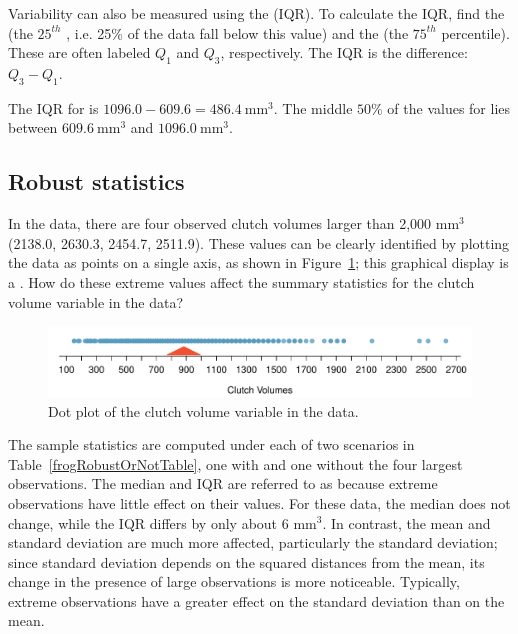 Variability can also be measured using the  (IQR).  To calculate the IQR, find the   (the $25^{th}$ , i.e. 25\% of the data fall below this value) and the   (the $75^{th}$ percentile). These are often labeled $Q_1$ and $Q_3$, respectively. The IQR is the difference: $Q_3 - Q_1$.

The IQR for  is $1096.0 - 609.6 = 486.4\ \textrm{mm}^{3}$.  The middle $50\%$ of the values for  lies between $609.6\ \textrm{mm}^{3}$ and $1096.0\ \textrm{mm}^{3}$.

\subsection{Robust statistics}

In the  data, there are four observed clutch volumes larger than 2,000 $\textrm{mm}^{3}$ (2138.0, 2630.3, 2454.7, 2511.9). These values can be clearly identified by plotting the data as points on a single axis, as shown in Figure~\ref{frogClutchVolDotPlot}; this graphical display is a . How do these extreme values affect the summary statistics for the clutch volume variable in the  data?

\begin{figure}[ht]
	\centering
	\includegraphics[width=\textwidth]{ch_intro_to_data_oi_biostat/figures/frogClutchVolDotPlot/frogClutchVolDotPlot}
	\caption{Dot plot of the clutch volume variable in the  data.}
	\label{frogClutchVolDotPlot}
\end{figure}

The sample statistics are computed under each of two scenarios in Table~\ref{frogRobustOrNotTable}, one with and one without the four largest observations. The median and IQR are referred to as  because extreme observations have little effect on their values. For these data, the median does not change, while the IQR differs by only about 6 $\textrm{mm}^{3}$. In contrast, the mean and standard deviation are much more affected, particularly the standard deviation; since standard deviation depends on the squared distances from the mean, its change in the presence of large observations is more noticeable. Typically, extreme observations have a greater effect on the standard deviation than on the mean.

